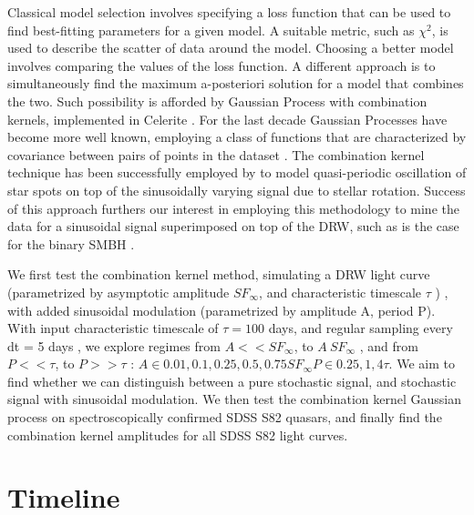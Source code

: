\documentclass[modern]{aastex62}
\begin{document}
Classical model selection involves specifying a loss function that can be used to find best-fitting parameters for a given model. A suitable metric, such as $\chi^{2}$, is used to  describe the scatter of data around the model. Choosing a better model involves comparing the values of the loss function. A different approach is to simultaneously find the maximum a-posteriori solution for a model that combines the two. Such possibility is afforded by Gaussian Process with combination kernels,  implemented in Celerite  \citep{foreman2017}. For the last decade Gaussian Processes have become more well known, employing a class of functions that  are characterized by covariance between pairs of points in the dataset \citep{rassmussen2006, foreman2017}.  The combination kernel technique has been successfully employed by  \cite{angus2018}  to model  quasi-periodic oscillation of star spots on top of the sinusoidally varying signal due to stellar rotation. Success of this approach furthers our interest in employing this methodology to mine the data for a sinusoidal signal superimposed on top of the DRW, such as is the case for the binary SMBH \citep{charisi2018}. 

We first test the combination kernel method, simulating a DRW light curve (parametrized by asymptotic amplitude $SF_{\infty}$, and characteristic timescale $\tau$ ) , with  added sinusoidal modulation (parametrized by amplitude A, period P). With input characteristic timescale of $\tau  = 100 $ days, and regular sampling every dt = 5 days  , we explore regimes from $A << SF_{\infty}$,  to $A ~ SF_{\infty}$ , and from $P << \tau$, to $P >> \tau$ :  $A \in { 0.01,  0.1,  0.25,  0.5, 0.75 } SF_{\infty}  $\cross$ P \in { 0.25,  1 ,  4 } \tau  $. We aim to find whether we can distinguish between a pure stochastic signal, and stochastic signal with sinusoidal modulation. We then test the combination kernel Gaussian process on spectroscopically confirmed SDSS S82 quasars, and finally find  the combination kernel amplitudes for all SDSS S82 light curves.


\section{Timeline}




\end{document}
